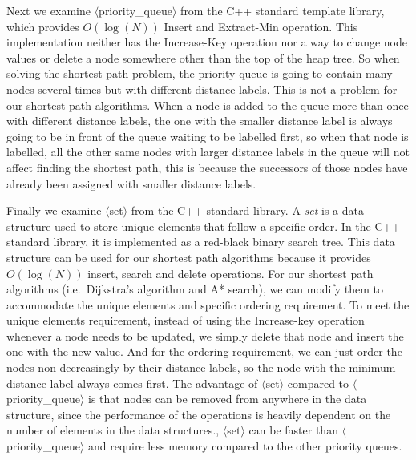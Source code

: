 Next we examine $\langle$priority\_queue$\rangle$ from the C++ standard template library,
which provides $O(\log(N))$ Insert and Extract-Min operation.
This implementation neither has the Increase-Key operation nor a way to change node values or delete a node somewhere other than the top of the heap tree.
So when solving the shortest path problem,
the priority queue is going to contain many nodes several times but with different distance labels.
This is not a problem for our shortest path algorithms.
When a node is added to the queue more than once with different distance labels,
the one with the smaller distance label is always going to be in front of the queue waiting to be labelled first,
so when that node is labelled,
all the other same nodes with larger distance labels in the queue will not affect finding the shortest path,
this is because the successors of those nodes have already been assigned with smaller distance labels.

Finally we examine $\langle$set$\rangle$ from the C++ standard library.
A \emph{set} is a data structure used to store unique elements that follow a specific order.
In the C++ standard library, it is implemented as a red-black binary search tree.
This data structure can be used for our shortest path algorithms because it provides $O(\log(N))$ insert, search and delete operations.
For our shortest path algorithms (i.e.\ Dijkstra's algorithm and A* search),
we can modify them to accommodate the unique elements and specific ordering requirement.
To meet the unique elements requirement,
instead of using the Increase-key operation whenever a node needs to be updated,
we simply delete that node and insert the one with the new value.
And for the ordering requirement,
we can just order the nodes non-decreasingly by their distance labels,
so the node with the minimum distance label always comes first.
The advantage of $\langle$set$\rangle$ compared to $\langle$priority\_queue$\rangle$ is that nodes can be removed from anywhere in the data structure,
since the performance of the operations is heavily dependent on the number of elements in the data structures.,
$\langle$set$\rangle$ can be faster than $\langle$priority\_queue$\rangle$ and require less memory compared to the other priority queues.

